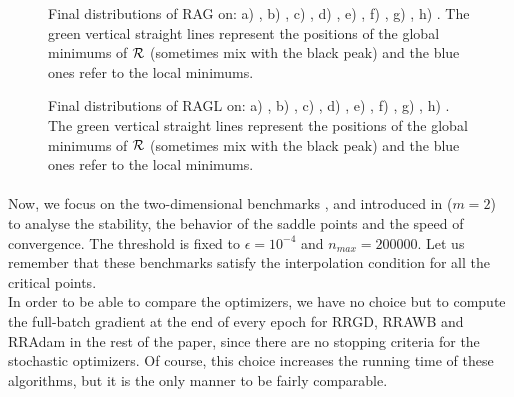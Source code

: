 \begin{figure}[h!]
	\centering
	\scalebox{0.45}{}
	\caption{Final distributions of RAG on: a) \exOne, b) \exTwo, c) \exThree, d) \exFour, e) \exFive, f) \exSix, g) \exSeven, h) \exHeight. The green vertical straight lines represent the positions of the global minimums of $\mathcal{R}$ (sometimes mix with the black peak) and the blue ones refer to the local minimums.}
	\label{RAG_exs}
\end{figure}

\begin{figure}[h!]
	\centering
	\scalebox{0.45}{}
	\caption{Final distributions of RAGL on: a) \exOne, b) \exTwo, c) \exThree, d) \exFour, e) \exFive, f) \exSix, g) \exSeven, h) \exHeight. The green vertical straight lines represent the positions of the global minimums of $\mathcal{R}$ (sometimes mix with the black peak) and the blue ones refer to the local minimums.}
	\label{RAGL_exs}
\end{figure}

\paragraph{}
Now, we focus on the two-dimensional benchmarks \polyTwo, \polyThree and \polyFive introduced in \cite{Bilel} ($m=2$) to analyse the stability, the behavior of the saddle points and the speed of convergence. The threshold is fixed to $\epsilon=10^{-4}$ and $n_{max}=200000$. Let us remember that these benchmarks satisfy the interpolation condition for all the critical points. \\
In order to be able to compare the optimizers, we have no choice but to compute the full-batch gradient at the end of every epoch for RRGD, RRAWB and RRAdam in the rest of the paper, since there are no stopping criteria for the stochastic optimizers. Of course, this choice increases the running time of these algorithms, but it is the only manner to be fairly comparable.

